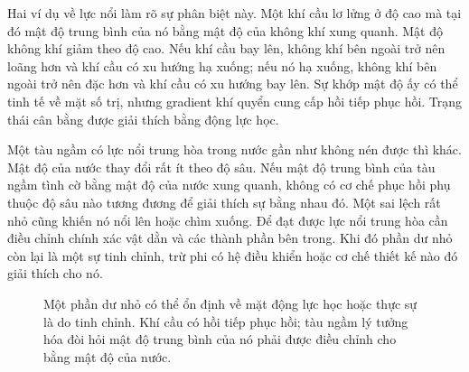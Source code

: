 Hai ví dụ về lực nổi làm rõ sự phân biệt này. Một khí cầu lơ lửng ở độ cao mà tại đó mật độ trung bình của nó bằng mật độ của không khí xung quanh. Mật độ không khí giảm theo độ cao. Nếu khí cầu bay lên, không khí bên ngoài trở nên loãng hơn và khí cầu có xu hướng hạ xuống; nếu nó hạ xuống, không khí bên ngoài trở nên đặc hơn và khí cầu có xu hướng bay lên. Sự khớp mật độ ấy có thể tinh tế về mặt số trị, nhưng gradient khí quyển cung cấp hồi tiếp phục hồi. Trạng thái cân bằng được giải thích bằng động lực học.

Một tàu ngầm có lực nổi trung hòa trong nước gần như không nén được thì khác. Mật độ của nước thay đổi rất ít theo độ sâu. Nếu mật độ trung bình của tàu ngầm tình cờ bằng mật độ của nước xung quanh, không có cơ chế phục hồi phụ thuộc độ sâu nào tương đương để giải thích sự bằng nhau đó. Một sai lệch rất nhỏ cũng khiến nó nổi lên hoặc chìm xuống. Để đạt được lực nổi trung hòa cần điều chỉnh chính xác vật dằn và các thành phần bên trong. Khi đó phần dư nhỏ còn lại là một sự tinh chỉnh, trừ phi có hệ điều khiển hoặc cơ chế thiết kế nào đó giải thích cho nó.

\begin{figure}[ht]
\centering
{}
\caption{Một phần dư nhỏ có thể ổn định về mặt động lực học hoặc thực sự là do tinh chỉnh. Khí cầu có hồi tiếp phục hồi; tàu ngầm lý tưởng hóa đòi hỏi mật độ trung bình của nó phải được điều chỉnh cho bằng mật độ của nước.}
\label{fig:blimp-submarine}
\end{figure}


